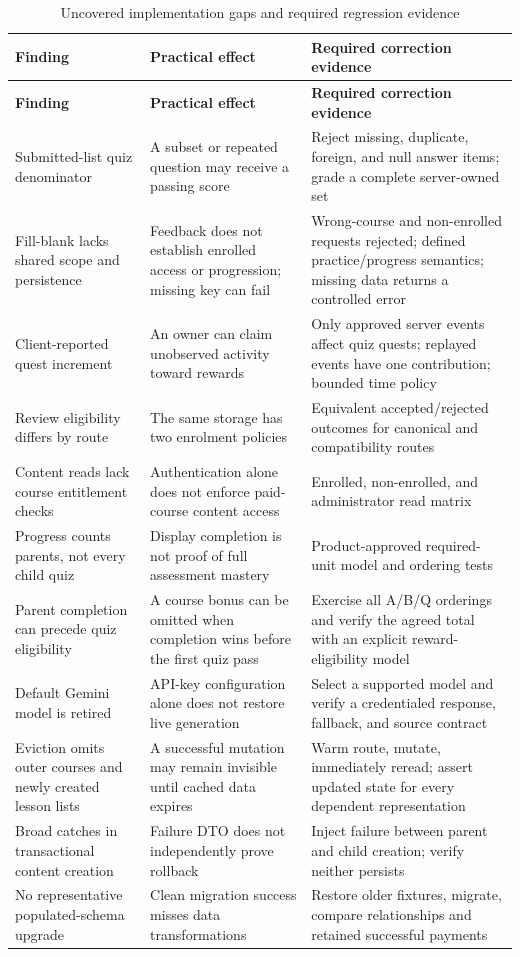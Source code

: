 \documentclass[12pt,a4paper,oneside]{report}
\begin{document}
\begin{longtable}{P{0.28\textwidth}P{0.30\textwidth}P{0.31\textwidth}}
\caption{Uncovered implementation gaps and required regression evidence}\label{tab:audit-gaps}\\\toprule
\textbf{Finding} & \textbf{Practical effect} & \textbf{Required correction evidence}\\\midrule\endfirsthead
\toprule\textbf{Finding} & \textbf{Practical effect} & \textbf{Required correction evidence}\\\midrule\endhead
Submitted-list quiz denominator & A subset or repeated question may receive a passing score & Reject missing, duplicate, foreign, and null answer items; grade a complete server-owned set\\
Fill-blank lacks shared scope and persistence & Feedback does not establish enrolled access or progression; missing key can fail & Wrong-course and non-enrolled requests rejected; defined practice/progress semantics; missing data returns a controlled error\\
Client-reported quest increment & An owner can claim unobserved activity toward rewards & Only approved server events affect quiz quests; replayed events have one contribution; bounded time policy\\
Review eligibility differs by route & The same storage has two enrolment policies & Equivalent accepted/rejected outcomes for canonical and compatibility routes\\
Content reads lack course entitlement checks & Authentication alone does not enforce paid-course content access & Enrolled, non-enrolled, and administrator read matrix\\
Progress counts parents, not every child quiz & Display completion is not proof of full assessment mastery & Product-approved required-unit model and ordering tests\\
Parent completion can precede quiz eligibility & A course bonus can be omitted when completion wins before the first quiz pass & Exercise all A/B/Q orderings and verify the agreed total with an explicit reward-eligibility model\\
Default Gemini model is retired & API-key configuration alone does not restore live generation & Select a supported model and verify a credentialed response, fallback, and source contract\\
Eviction omits outer courses and newly created lesson lists & A successful mutation may remain invisible until cached data expires & Warm route, mutate, immediately reread; assert updated state for every dependent representation\\
Broad catches in transactional content creation & Failure DTO does not independently prove rollback & Inject failure between parent and child creation; verify neither persists\\
No representative populated-schema upgrade & Clean migration success misses data transformations & Restore older fixtures, migrate, compare relationships and retained successful payments\\
\bottomrule
\end{longtable}
\end{document}
